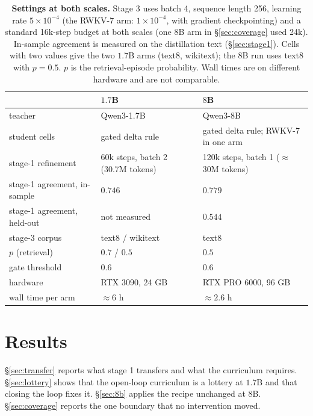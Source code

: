 \documentclass{article}
\begin{document}
\begin{table}[t]
\centering
\caption{\textbf{Settings at both scales.} Stage 3 uses batch 4, sequence length 256, learning rate $5{\times}10^{-4}$ (the RWKV-7 arm: $1{\times}10^{-4}$, with gradient checkpointing) and a standard 16k-step budget at both scales (one 8B arm in \S\ref{sec:coverage} used 24k). In-sample agreement is measured on the distillation text (\S\ref{sec:stage1}). Cells with two values give the two $1.7$B arms (text8, wikitext); the $8$B run uses text8 with $p{=}0.5$. $p$ is the retrieval-episode probability. Wall times are on different hardware and are not comparable.}
\label{tab:settings}
\vskip 0.1in
\scriptsize
\setlength{\tabcolsep}{2pt}
\begin{tabular}{@{}p{}p{}p{}@{}}
\toprule
 & $1.7$B & $8$B \\
\midrule
teacher & Qwen3-1.7B & Qwen3-8B \\
student cells & gated delta rule & gated delta rule; RWKV-7 in one arm \\
stage-1 refinement & 60k steps, batch 2 (30.7M tokens) & 120k steps, batch 1 (${\approx}$30M tokens) \\
stage-1 agreement, in-sample & $0.746$ & $0.779$ \\
stage-1 agreement, held-out & not measured & $0.544$ \\
stage-3 corpus & text8 / wikitext & text8 \\
$p$ (retrieval) & $0.7$ / $0.5$ & $0.5$ \\
gate threshold & $0.6$ & $0.6$ \\
hardware & RTX 3090, 24 GB & RTX PRO 6000, 96 GB \\
wall time per arm & ${\approx}6$ h & ${\approx}2.6$ h \\
\bottomrule
\end{tabular}
\end{table}

\section{Results}\label{sec:results}

\S\ref{sec:transfer} reports what stage 1 transfers and what the curriculum requires. \S\ref{sec:lottery} shows that the open-loop curriculum is a lottery at $1.7$B and that closing the loop fixes it. \S\ref{sec:8b} applies the recipe unchanged at $8$B. \S\ref{sec:coverage} reports the one boundary that no intervention moved.
\end{document}
